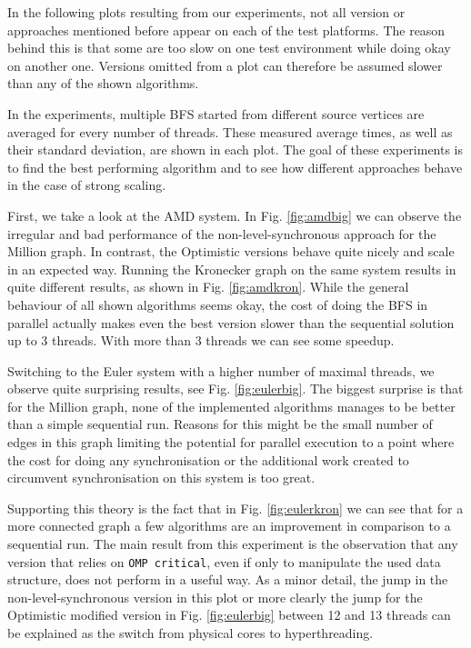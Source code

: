 \documentclass[letterpaper]{article}
\begin{document}


		In the following plots resulting from our experiments, not all version or approaches mentioned before appear on each of the test platforms. 
		The reason behind this is that some are too slow on one test environment while doing okay on another one.
		Versions omitted from a plot can therefore be assumed slower than any of the shown algorithms.
		
		In the experiments, multiple BFS started from different source vertices are averaged for every number of threads. 
		These measured average times, as well as their standard deviation, are shown in each plot.
		The goal of these experiments is to find the best performing algorithm and to see how different approaches behave in the case of strong scaling.

		First, we take a look at the AMD system.
		In Fig. \ref{fig:amdbig} we can observe the irregular and bad performance of the non-level-synchronous approach for the Million graph.
		In contrast, the Optimistic versions behave quite nicely and scale in an expected way.
		Running the Kronecker graph on the same system results in quite different results, as shown in Fig. \ref{fig:amdkron}.
		While the general behaviour of all shown algorithms seems okay, the cost of doing the BFS in parallel actually makes even the best version slower than the sequential solution up to 3 threads.
		With more than 3 threads we can see some speedup. 
		
		Switching to the Euler system with a higher number of maximal threads, we observe quite surprising results, see Fig. \ref{fig:eulerbig}.
		The biggest surprise is that for the Million graph, none of the implemented algorithms manages to be better than a simple sequential run.
		Reasons for this might be the small number of edges in this graph limiting the potential for parallel execution to a point where the cost for doing any synchronisation or the additional work created to circumvent synchronisation on this system is too great.

		Supporting this theory is the fact that in Fig. \ref{fig:eulerkron} we can see that for a more connected graph a few algorithms are an improvement in comparison to a sequential run.
		The main result from this experiment is the observation that any version that relies on \verb+OMP critical+, even if only to manipulate the used data structure, does not perform in a useful way.
		As a minor detail, the jump in the non-level-synchronous version in this plot or more clearly the jump for the Optimistic modified version in Fig. \ref{fig:eulerbig} between 12 and 13 threads can be explained as the switch from physical cores to hyperthreading.
\end{document}
